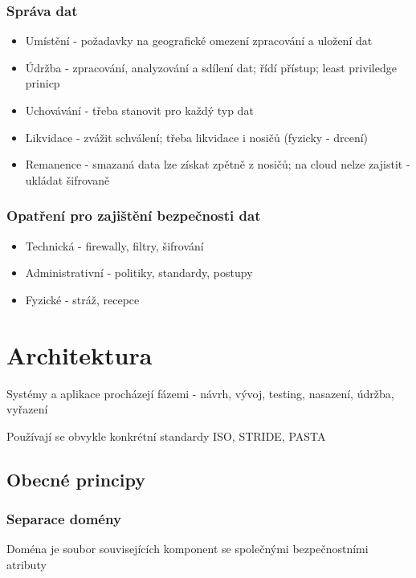 \documentclass[10pt,a4paper]{article}
\begin{document}
\subsubsection*{Správa dat}
\begin{itemize}
    \item Umístění - požadavky na geografické omezení zpracování a uložení dat
    \item Údržba - zpracování, analyzování a sdílení dat; řídí přístup; least priviledge prinicp
    \item Uchovávání - třeba stanovit pro každý typ dat
    \item Likvidace - zvážit schválení; třeba likvidace i nosičů (fyzicky - drcení)
    \item Remanence - smazaná data lze získat zpětně z nosičů; na cloud nelze zajistit - ukládat šifrovaně
\end{itemize}

\subsubsection*{Opatření pro zajištění bezpečnosti dat}
\begin{itemize}\setlength\itemsep{0em}
    \item Technická - firewally, filtry, šifrování
    \item Administrativní - politiky, standardy, postupy
    \item Fyzické - stráž, recepce
\end{itemize}

\newpage
\section{Architektura}

Systémy a aplikace procházejí fázemi - návrh, vývoj, testing, nasazení, údržba, vyřazení

Používají se obvykle konkrétní standardy ISO, STRIDE, PASTA

\subsection*{Obecné principy}

\subsubsection*{Separace domény}

Doména je soubor souvisejících komponent se společnými bezpečnostními atributy
\end{document}
